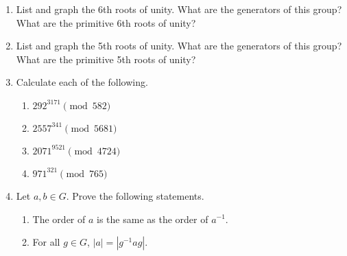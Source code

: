 {\begin{enumerate}
\begin{multicols}{2}
\begin{enumerate}
 \item
$|z| = | \overline{z}|$

\item
$z \overline{z} = |z|^2$
 
 \item
$z^{-1} = \overline{z} / |z|^2$

 \item
$|z +w| \leq |z| + |w|$
 
 \item
$|z - w| \geq | |z| - |w||$
 
 \item
$|z w| = |z|  |w|$
 
\end{enumerate}
\end{multicols}


\item
List and graph the 6th roots of unity.  What are the generators of
this group?  What are the primitive 6th roots of unity?
 
 
\item
List and graph the 5th roots of unity.  What are the generators of
this group?  What are the primitive 5th roots of unity? 
 
 
  
\item
Calculate each of the following.
\begin{multicols}{2}
\begin{enumerate}
 
 \item
$292^{3171} \pmod{ 582}$

\item
$2557^{ 341} \pmod{ 5681}$

 \item
$2071^{ 9521} \pmod{ 4724}$
 
 \item
$971^{ 321} \pmod{ 765}$
 
\end{enumerate}
\end{multicols}
 
 
  
 
\item
Let $a, b \in G$.  Prove the following statements.
\begin{enumerate}
 
 \item
The order of $a$ is the same as the order of $a^{-1}$.
 
 \item
For all $g \in G$, $|a| = |g^{-1}ag|$.
 

\end{enumerate}
\end{enumerate}}

